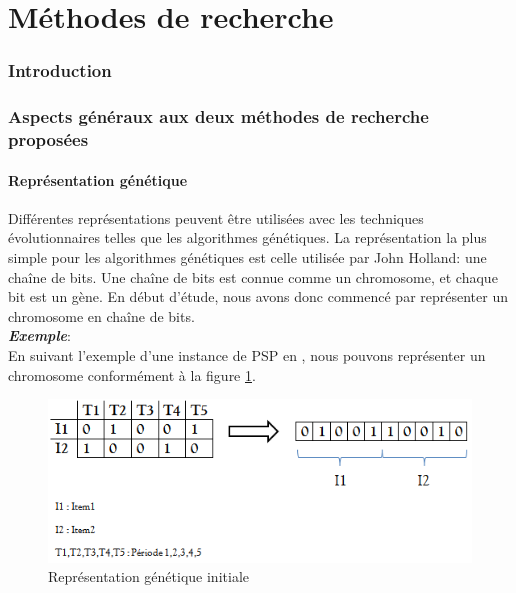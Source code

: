 \documentclass[12pt,a4paper]{article}
\begin{document}
	\newpage
	
	\part{Méthodes de recherche}
	\setcounter{section}{0}
	\section*{Introduction}
	\section{Aspects généraux aux deux méthodes de recherche proposées}
	\subsection{Représentation génétique}
	Différentes représentations peuvent être utilisées avec les techniques évolutionnaires telles que les algorithmes génétiques. La représentation la plus simple pour les algorithmes génétiques est celle utilisée par John Holland: une chaîne de bits. Une chaîne de bits est connue comme un chromosome, et chaque bit est un gène. En début d'étude, nous avons donc commencé par représenter un chromosome en chaîne de bits. \\
	\textsl{\textbf{Exemple}}:\\
	\hspace*{.5cm} En suivant l'exemple d'une instance de PSP en \pageref{sec:problem_description}, nous pouvons représenter un chromosome conformément à la figure \ref{fig:init_gene_repr}.
	
	\begin{figure}[h]
		\begin{center}
			\includegraphics[scale=.5]{img/init_gene_repr.png}
			\caption{Représentation génétique initiale}
			\label{fig:init_gene_repr}
		\end{center}
	\end{figure}
	
\end{document}
